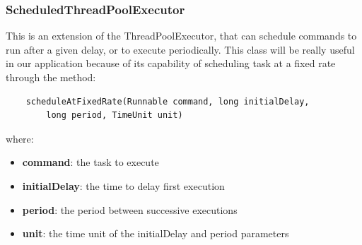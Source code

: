 \subsubsection{ScheduledThreadPoolExecutor}
This is an extension of the ThreadPoolExecutor, that can schedule commands to run after a given delay, or to execute periodically. This class will be really useful in our application because of its capability of scheduling task at a fixed rate through the method:
\begin{lstlisting}
	scheduleAtFixedRate(Runnable command, long initialDelay,
		long period, TimeUnit unit)
\end{lstlisting}
where:
\begin{itemize}
	\item \textbf{command}: the task to execute
	\item \textbf{initialDelay}: the time to delay first execution
	\item \textbf{period}: the period between successive executions
	\item \textbf{unit}: the time unit of the initialDelay and period parameters
\end{itemize}

